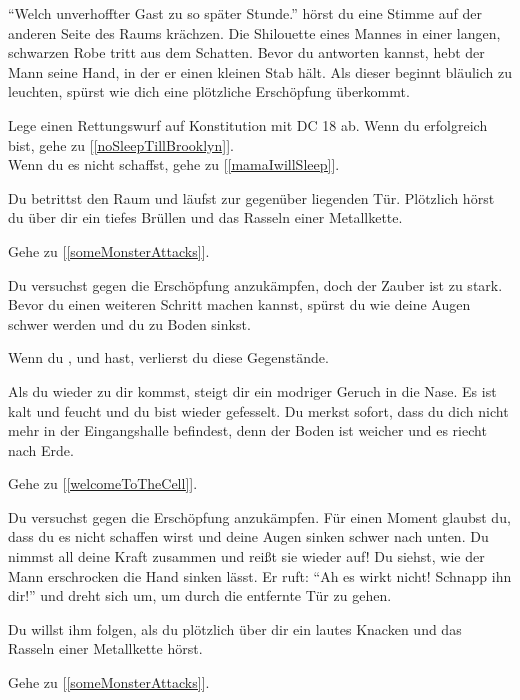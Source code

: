 ``Welch unverhoffter Gast zu so später Stunde.'' hörst du eine Stimme auf der anderen Seite des Raums krächzen. Die Shilouette eines Mannes in einer langen, schwarzen Robe tritt aus dem Schatten. Bevor du antworten kannst, hebt der Mann seine Hand, in der er einen kleinen Stab hält. Als dieser beginnt bläulich zu leuchten, spürst wie dich eine plötzliche Erschöpfung überkommt.

Lege einen Rettungswurf auf Konstitution mit DC 18 ab. Wenn du erfolgreich bist, gehe zu [\ref{noSleepTillBrooklyn}].
\\Wenn du es nicht schaffst, gehe zu [\ref{mamaIwillSleep}].


Du betrittst den Raum und läufst zur gegenüber liegenden Tür. Plötzlich hörst du über dir ein tiefes Brüllen und das Rasseln einer Metallkette.

Gehe zu [\ref{someMonsterAttacks}].


Du versuchst gegen die Erschöpfung anzukämpfen, doch der Zauber ist zu stark. Bevor du einen weiteren Schritt machen kannst, spürst du wie deine Augen schwer werden und du zu Boden sinkst.

Wenn du ,  und  hast, verlierst du diese Gegenstände.

Als du wieder zu dir kommst, steigt dir ein modriger Geruch in die Nase. Es ist kalt und feucht und du bist wieder gefesselt. Du merkst sofort, dass du dich nicht mehr in der Eingangshalle befindest, denn der Boden ist weicher und es riecht nach Erde.

Gehe zu [\ref{welcomeToTheCell}].


Du versuchst gegen die Erschöpfung anzukämpfen. Für einen Moment glaubst du, dass du es nicht schaffen wirst und deine Augen sinken schwer nach unten. Du nimmst all deine Kraft zusammen und reißt sie wieder auf! Du siehst, wie der Mann erschrocken die Hand sinken lässt. Er ruft: ``Ah es wirkt nicht! Schnapp ihn dir!'' und dreht sich um, um durch die entfernte Tür zu gehen.

Du willst ihm folgen, als du plötzlich über dir ein lautes Knacken und das Rasseln einer Metallkette hörst.

Gehe zu [\ref{someMonsterAttacks}].

